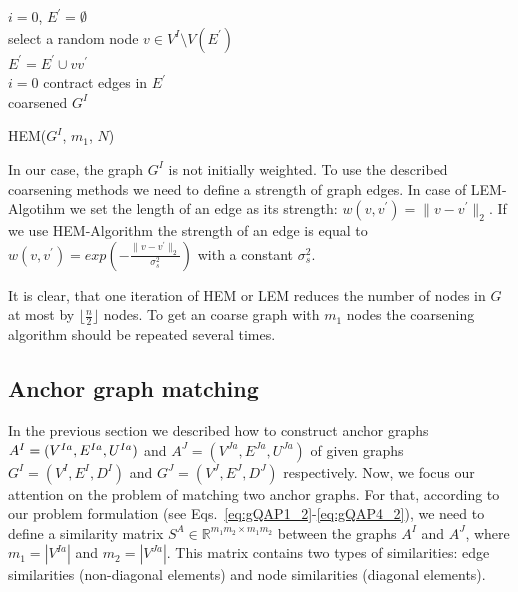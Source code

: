 \begin{algorithm}[h]
	$i = 0$, $E^\prime=\emptyset$ \\
	{ select a random node $v\in V^I\setminus V(E^\prime)$ \\
	  {$E^\prime=E^\prime\cup vv^\prime$\\
	   $i=0$}
	}
	contract edges in $E^\prime$\\ 
	\Return coarsened $G^I$
	\caption{HEM($G^I$, $m_1$, $N$)} \label{alg:HEM}
\end{algorithm}

In our case, the graph $G^I$ is not initially weighted. To use the described coarsening methods we need to define a strength of graph edges. In case of LEM-Algotihm we set the length of an edge as its strength: $w(v,v^\prime)=\|v-v^{\prime}\|_{2}$. If we use HEM-Algorithm the strength of an edge is equal to $w(v,v^\prime) = exp(-\frac{\|v-v^\prime\|_{2}}{\sigma^2_{s}})$ with a constant $\sigma^2_{s}$.

It is clear, that one iteration of HEM or LEM reduces the number of nodes in $G$ at most by $\lfloor\frac{n}{2} \rfloor$ nodes. To get an coarse graph with $m_1$ nodes the coarsening algorithm should be repeated several times.

\subsection{Anchor graph matching}
\label{anchorGraphMatching}
In the previous section we described how to construct anchor graphs $A^I=(V^{Ia},E^{Ia},\newline U^{Ia})$ and $A^J=(V^{Ja},E^{Ja},U^{Ja})$ of given graphs $G^I = (V^I, E^I, D^I)$ and $G^J=(V^J, E^J, D^J)$ respectively. Now, we focus our attention on the problem of matching two anchor graphs. For that, according to our problem formulation (see Eqs.~\eqref{eq:gQAP1_2}-\eqref{eq:gQAP4_2}), we need to define a similarity matrix $S^A\in\mathbb{R}^{m_1m_2\times m_1m_2}$ between the graphs $A^I$ and $A^J$, where $m_1=|V^{Ia}|$ and $m_2=|V^{Ja}|$. This matrix contains two types of similarities: edge similarities (non-diagonal elements) and node similarities (diagonal elements).

